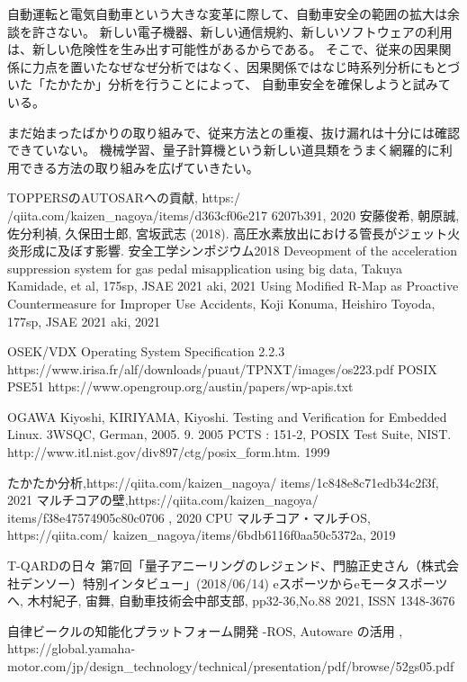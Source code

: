 \documentclass[twocolumn]{article} %
\begin{document}
自動運転と電気自動車という大きな変革に際して、自動車安全の範囲の拡大は余談を許さない。
新しい電子機器、新しい通信規約、新しいソフトウェアの利用は、新しい危険性を生み出す可能性があるからである。
そこで、従来の因果関係に力点を置いたなぜなぜ分析ではなく、因果関係ではなじ時系列分析にもとづいた「たかたか」分析を行うことによって、
自動車安全を確保しようと試みている。

まだ始まったばかりの取り組みで、従来方法との重複、抜け漏れは十分には確認できていない。
機械学習、量子計算機という新しい道具類をうまく網羅的に利用できる方法の取り組みを広げていきたい。

\begin{thebibliography}{99}
%
 TOPPERSのAUTOSARへの貢献, https:/ /qiita.com/kaizen\_nagoya/items/d363cf06e217 6207b391, 2020
安藤俊希, 朝原誠, 佐分利禎, 久保田士郎, 宮坂武志 (2018). 高圧水素放出における管長がジェット火炎形成に及ぼす影響. 安全工学シンポジウム2018 
 Deveopment of the acceleration suppression system for gas pedal misapplication using big data, Takuya Kamidade, et al, 175sp, JSAE 2021 aki, 2021
 Using Modified R-Map as Proactive Countermeasure for Improper Use Accidents, Koji Konuma, Heishiro Toyoda, 177sp, JSAE 2021 aki, 2021


OSEK/VDX Operating System Specification 2.2.3 https://www.irisa.fr/alf/downloads/puaut/TPNXT/images/os223.pdf
 POSIX PSE51 https://www.opengroup.org/austin/papers/wp-apis.txt


 OGAWA Kiyoshi, KIRIYAMA, Kiyoshi. Testing and Verification for Embedded Linux. 3WSQC, German, 2005. 9. 2005 
 PCTS : 151-2, POSIX Test Suite, NIST. http://www.itl.nist.gov/div897/ctg/posix\_form.htm. 1999 

 たかたか分析,https://qiita.com/kaizen\_nagoya/ items/1c848e8c71edb34c2f3f, 2021
マルチコアの壁,https://qiita.com/kaizen\_nagoya/ items/f38e47574905c80c0706 , 2020
 CPU マルチコア・マルチOS, https://qiita.com/ kaizen\_nagoya/items/6bdb6116f0aa50c5372a, 2019

T-QARDの日々 第7回「量子アニーリングのレジェンド、門脇正史さん（株式会社デンソー）特別インタビュー」(2018/06/14)
 eスポーツからeモータスポーツへ, 木村紀子, 宙舞, 自動車技術会中部支部, pp32-36,No.88 2021, ISSN 1348-3676

 自律ビークルの知能化プラットフォーム開発 -ROS, Autoware の活用 , 
https://global.yamaha-motor.com/jp/design\_technology/technical/presentation/pdf/browse/52gs05.pdf


\end{thebibliography}
\end{document}
